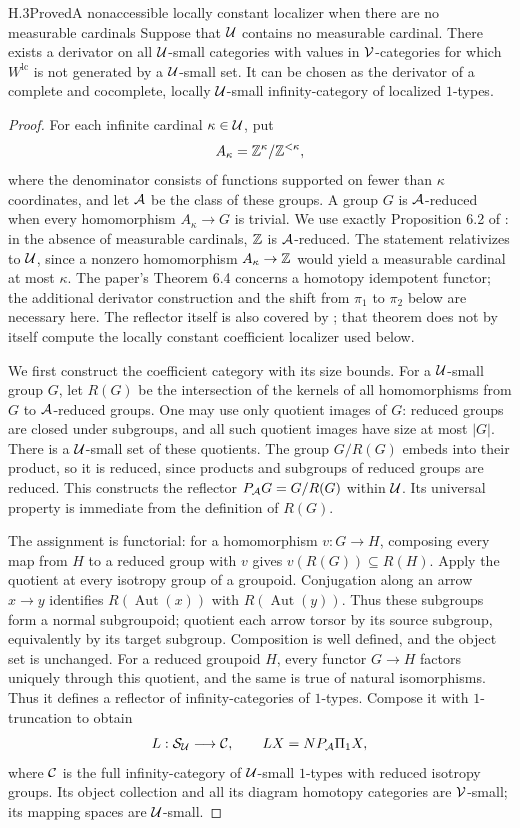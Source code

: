 \begin{claim}{H.3}{Proved}{A nonaccessible locally constant localizer when there are no measurable cardinals}
Suppose that $\mathcal U$ contains no measurable cardinal. There exists a derivator on all $\mathcal U$-small categories with values in $\mathcal V$-categories for which $W^{\mathrm{lc}}$ is not generated by a $\mathcal U$-small set. It can be chosen as the derivator of a complete and cocomplete, locally $\mathcal U$-small infinity-category of localized $1$-types.
\end{claim}
\begin{proof}
For each infinite cardinal $\kappa\in\mathcal U$, put
\[
 A_\kappa=\mathbb Z^\kappa/\mathbb Z^{<\kappa},
\]
where the denominator consists of functions supported on fewer than $\kappa$ coordinates, and let $\mathcal A$ be the class of these groups. A group $G$ is $\mathcal A$-reduced when every homomorphism $A_\kappa\to G$ is trivial. We use exactly Proposition 6.2 of \cite{FGHCSS2005}: in the absence of measurable cardinals, $\mathbb Z$ is $\mathcal A$-reduced. The statement relativizes to $\mathcal U$, since a nonzero homomorphism $A_\kappa\to\mathbb Z$ would yield a measurable cardinal at most $\kappa$. The paper's Theorem 6.4 concerns a homotopy idempotent functor; the additional derivator construction and the shift from $\pi_1$ to $\pi_2$ below are necessary here. The reflector itself is also covered by \cite[Theorem 3.3 with $n=1$, and Section 6.1]{FGHChristensen2024}; that theorem does not by itself compute the locally constant coefficient localizer used below.

We first construct the coefficient category with its size bounds. For a $\mathcal U$-small group $G$, let $R(G)$ be the intersection of the kernels of all homomorphisms from $G$ to $\mathcal A$-reduced groups. One may use only quotient images of $G$: reduced groups are closed under subgroups, and all such quotient images have size at most $|G|$. There is a $\mathcal U$-small set of these quotients. The group $G/R(G)$ embeds into their product, so it is reduced, since products and subgroups of reduced groups are reduced. This constructs the reflector $P_{\mathcal A} G=G/R(G)$ within $\mathcal U$. Its universal property is immediate from the definition of $R(G)$.

The assignment is functorial: for a homomorphism $v:G\to H$, composing every map from $H$ to a reduced group with $v$ gives $v(R(G))\subseteq R(H)$. Apply the quotient at every isotropy group of a groupoid. Conjugation along an arrow $x\to y$ identifies $R(\operatorname{Aut}(x))$ with $R(\operatorname{Aut}(y))$. Thus these subgroups form a normal subgroupoid; quotient each arrow torsor by its source subgroup, equivalently by its target subgroup. Composition is well defined, and the object set is unchanged. For a reduced groupoid $H$, every functor $G\to H$ factors uniquely through this quotient, and the same is true of natural isomorphisms. Thus it defines a reflector of infinity-categories of $1$-types. Compose it with $1$-truncation to obtain
\[
 L:\mathcal S_{\mathcal U}\longrightarrow\mathcal C,
 \qquad LX=NP_{\mathcal A}\Pi_1X,
\]
where $\mathcal C$ is the full infinity-category of $\mathcal U$-small $1$-types with reduced isotropy groups. Its object collection and all its diagram homotopy categories are $\mathcal V$-small; its mapping spaces are $\mathcal U$-small.


\end{proof}
